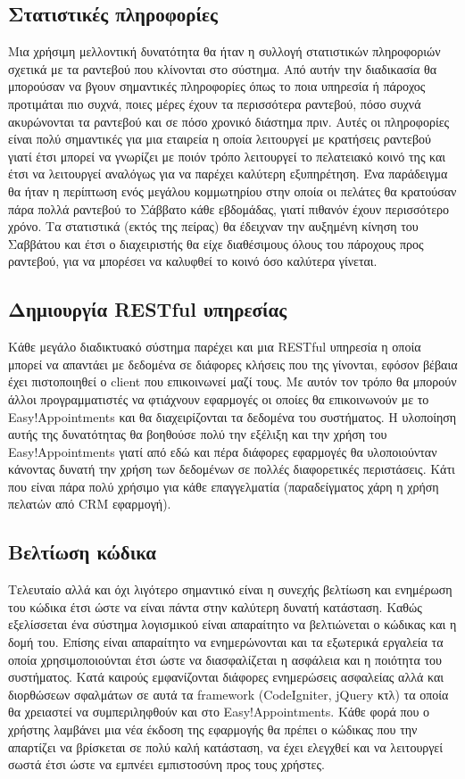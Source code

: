 \subsection{Στατιστικές πληροφορίες} 
Μια χρήσιμη μελλοντική δυνατότητα θα ήταν η συλλογή στατιστικών πληροφοριών σχετικά με τα ραντεβού που κλίνονται στο σύστημα. Από αυτήν την διαδικασία θα μπορούσαν να βγουν σημαντικές πληροφορίες όπως το ποια υπηρεσία ή πάροχος προτιμάται πιο συχνά, ποιες μέρες έχουν τα περισσότερα ραντεβού, πόσο συχνά ακυρώνονται τα ραντεβού και σε πόσο χρονικό διάστημα πριν. Αυτές οι πληροφορίες είναι πολύ σημαντικές για μια εταιρεία η οποία λειτουργεί με κρατήσεις ραντεβού γιατί έτσι μπορεί να γνωρίζει με ποιόν τρόπο λειτουργεί το πελατειακό κοινό της και έτσι να λειτουργεί αναλόγως για να παρέχει καλύτερη εξυπηρέτηση. Ένα παράδειγμα θα ήταν η περίπτωση ενός μεγάλου κομμωτηρίου στην οποία οι πελάτες θα κρατούσαν πάρα πολλά ραντεβού το Σάββατο κάθε εβδομάδας, γιατί πιθανόν έχουν περισσότερο χρόνο. Τα στατιστικά (εκτός της πείρας) θα έδειχναν την αυξημένη κίνηση του Σαββάτου και έτσι ο διαχειριστής θα είχε διαθέσιμους όλους του πάροχους προς ραντεβού, για να μπορέσει να καλυφθεί το κοινό όσο καλύτερα γίνεται.

\subsection{Δημιουργία RESTful υπηρεσίας}
Κάθε μεγάλο διαδικτυακό σύστημα παρέχει και μια RESTful υπηρεσία η οποία μπορεί να απαντάει με δεδομένα σε διάφορες κλήσεις που της γίνονται, εφόσον βέβαια έχει πιστοποιηθεί ο client που επικοινωνεί μαζί τους. Με αυτόν τον τρόπο θα μπορούν άλλοι προγραμματιστές να φτιάχνουν εφαρμογές οι οποίες θα επικοινωνούν με το Easy!Appointments και θα διαχειρίζονται τα δεδομένα του συστήματος. Η υλοποίηση αυτής της δυνατότητας θα βοηθούσε πολύ την εξέλιξη και την χρήση του Easy!Appointments γιατί από εδώ και πέρα διάφορες εφαρμογές θα υλοποιούνταν κάνοντας δυνατή την χρήση των δεδομένων σε πολλές διαφορετικές περιστάσεις. Κάτι που είναι πάρα πολύ χρήσιμο για κάθε επαγγελματία (παραδείγματος χάρη η χρήση πελατών από CRM εφαρμογή).

\subsection{Βελτίωση κώδικα}
Τελευταίο αλλά και όχι λιγότερο σημαντικό είναι η συνεχής βελτίωση και ενημέρωση του κώδικα έτσι ώστε να είναι πάντα στην καλύτερη δυνατή κατάσταση. Καθώς εξελίσσεται ένα σύστημα λογισμικού είναι απαραίτητο να βελτιώνεται ο κώδικας και η δομή του. Επίσης είναι απαραίτητο να ενημερώνονται και τα εξωτερικά εργαλεία τα οποία χρησιμοποιούνται έτσι ώστε να διασφαλίζεται η ασφάλεια και η ποιότητα του συστήματος. Κατά καιρούς εμφανίζονται διάφορες ενημερώσεις ασφαλείας αλλά και διορθώσεων σφαλμάτων σε αυτά τα framework (CodeIgniter, jQuery κτλ) τα οποία θα χρειαστεί να συμπεριληφθούν και στο Easy!Appointments. Κάθε φορά που ο χρήστης λαμβάνει μια νέα έκδοση της εφαρμογής θα πρέπει ο κώδικας που την απαρτίζει να βρίσκεται σε πολύ καλή κατάσταση, να έχει ελεγχθεί και να λειτουργεί σωστά έτσι ώστε να εμπνέει εμπιστοσύνη προς τους χρήστες.

